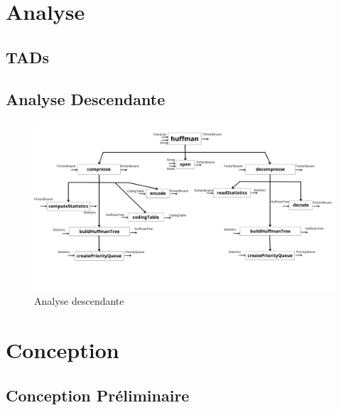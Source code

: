 \documentclass[12pt]{article}
\begin{document}


\newpage

\tableofcontents

\listoffigures


\newpage
\section{Analyse}

\subsection{TADs}







\subsection{Analyse Descendante}

\begin{figure}
    \centering
    \includegraphics[width=\textwidth]{parties/analyse/Analyse descendante/huffman.png}
    \caption{Analyse descendante}
\end{figure}

\section{Conception}

\subsection{Conception Préliminaire}



\end{document}
